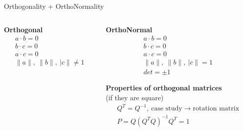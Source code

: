 \documentclass[aspectratio=169]{beamer}
\begin{document}
\begin{frame}[t]{Orthogonality + OrthoNormality}
\begin{columns}[T,onlytextwidth]
\begin{column}{0.49\textwidth}
            \begin{minipage}{0.58\textwidth}
            \end{minipage}\hfill
            \begin{minipage}{0.40\textwidth}
                \centering\textbf{Orthogonal}
                \begin{align*}
                    a \cdot b = 0 \\
                    b \cdot c = 0 \\
                    a \cdot c = 0 \\
                    \|a\|,\ \|b\|,\ |c\| \neq 1 
                \end{align*}
            \end{minipage}
    \end{column}
    \begin{column}{0.49\textwidth}
        \begin{minipage}{0.58\textwidth}
        \end{minipage}\hfill
        \begin{minipage}{0.40\textwidth}
            \centering\textbf{OrthoNormal}
            \begin{align*}
                a \cdot b = 0 \\
                b \cdot c = 0 \\
                a \cdot c = 0 \\
                \|a\|,\ \|b\|,\ |c\| = 1 \\
                det= \pm 1
            \end{align*}
        \end{minipage}
        \centering \textbf{Properties of orthogonal matrices} \\ {\centering (if they are square)}
        \begin{align*}
            Q^T=Q^{-1},\ \text{case study} \rightarrow \text{rotation matrix} \\
            P = Q(Q^TQ)^{-1}Q^T=1
        \end{align*}
    \end{column}
\end{columns}
\end{frame}
\end{document}
